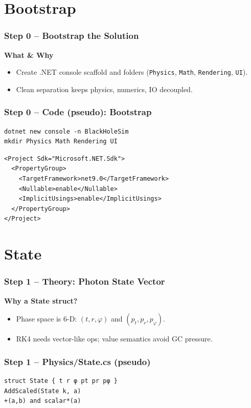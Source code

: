 \documentclass[aspectratio=169]{beamer}
\newcommand{\code}[1]{\texttt{#1}}
\newcommand{\ProgressStep}[1]{\progressstep{#1}}
\newcommand{\ThisFrameTitle}[1]{\frametitle{#1}}
\begin{document}
\section{Bootstrap}
\begin{frame}
  \ProgressStep{0}\ThisFrameTitle{Step 0 -- Bootstrap the Solution}
  \textbf{What \& Why}
  \begin{itemize}
    \item Create .NET console scaffold and folders (\code{Physics}, \code{Math}, \code{Rendering}, \code{UI}).
    \item Clean separation keeps physics, numerics, IO decoupled.
  \end{itemize}
\end{frame}

\begin{frame}[fragile]
  \ProgressStep{0}\ThisFrameTitle{Step 0 -- Code (pseudo): Bootstrap}
\begin{verbatim}
dotnet new console -n BlackHoleSim
mkdir Physics Math Rendering UI
\end{verbatim}
\begin{verbatim}
<Project Sdk="Microsoft.NET.Sdk">
  <PropertyGroup>
    <TargetFramework>net9.0</TargetFramework>
    <Nullable>enable</Nullable>
    <ImplicitUsings>enable</ImplicitUsings>
  </PropertyGroup>
</Project>
\end{verbatim}
\end{frame}

\section{State}
\begin{frame}
  \ProgressStep{1}\ThisFrameTitle{Step 1 -- Theory: Photon State Vector}
  \textbf{Why a State struct?}
  \begin{itemize}
    \item Phase space is $6$-D: $(t,r,\varphi)$ and $(p_t,p_r,p_\varphi)$.
    \item RK4 needs vector-like ops; value semantics avoid GC pressure.
  \end{itemize}
\end{frame}

\begin{frame}[fragile]
  \ProgressStep{1}\ThisFrameTitle{Step 1 -- Physics/State.cs (pseudo)}
\begin{verbatim}
struct State { t r φ pt pr pφ }
AddScaled(State k, a)
+(a,b) and scalar*(a)
\end{verbatim}
\end{frame}
\end{document}
